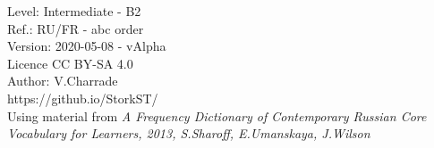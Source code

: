 \fontsize{5}{5}
\selectfont

\vspace{\baselineskip}
Level: Intermediate - B2\\
Ref.: RU/FR - abc order\\
Version: 2020-05-08 - vAlpha\\
Licence CC BY-SA 4.0\\

\noindent Author: V.Charrade\\
https://github.io/StorkST/\\
Using material from \textit{A Frequency Dictionary of Contemporary Russian Core Vocabulary for Learners, 2013, S.Sharoff, E.Umanskaya, J.Wilson}
